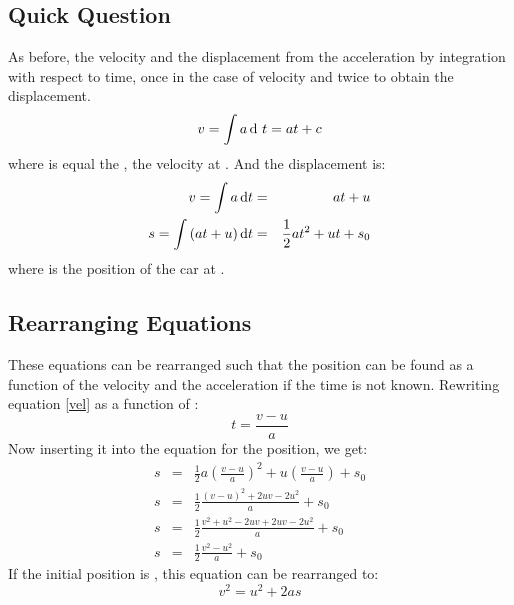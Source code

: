 \subsection*{Quick Question}
As before, the velocity and the displacement from the acceleration by integration with respect to time, once in the case of velocity and twice to obtain the displacement.
\begin{equation}
v = \int a \d\ t = at + c
\end{equation}
where  is equal the , the velocity at . And the displacement is:
\begin{eqnarray}
v = \int a \operatorname{d}\! t &=& at + u \label{vel} \\ 
s = \int \left(at + u\right) \operatorname{d}\! t &=& \frac{1}{2} a t^2 + u t + s_0 \label{s}
\end{eqnarray}
where  is the position of the car at . 

\subsection{Rearranging Equations}
These equations can be rearranged such that the position can be found as a function of the velocity and the acceleration if the time is not known. Rewriting equation \ref{vel} as a function of :
\begin{equation}
t = \frac{v-u}{a}
\end{equation}
Now inserting it into the equation for the position, we get:
\begin{eqnarray}
s &=& \frac{1}{2} a \left(\frac{v-u}{a}\right)^2 + u\left(\frac{v-u}{a}\right) + s_0\nonumber \\
s &=& \frac{1}{2}\frac{(v-u)^2 + 2uv - 2u^2}{a} + s_0 \nonumber\\
s &=& \frac{1}{2}\frac{v^2 + u^2 - 2uv + 2uv - 2u^2}{a} + s_0 \nonumber\\
s &=& \frac{1}{2} \frac{v^2 - u^2}{a} + s_0
\end{eqnarray}
If the initial position is , this equation can be rearranged to:
\begin{equation}
v^2 = u^2 + 2as
\end{equation}

 
 

